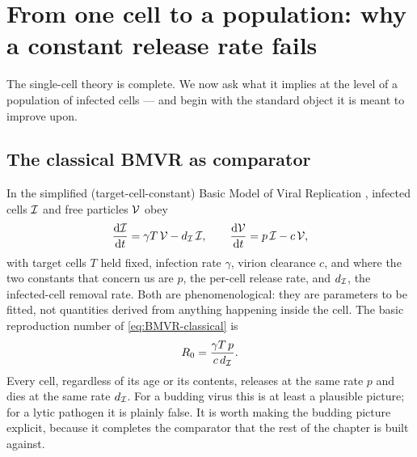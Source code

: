 
\section{From one cell to a population: why a constant release rate fails}
\label{sec:why-constant-fails}

The single-cell theory is complete. We now ask what it implies at the level
of a population of infected cells --- and begin with the standard object it
is meant to improve upon.

\subsection{The classical BMVR as comparator}
\label{sec:bmvr-classical}

In the simplified (target-cell-constant) Basic Model of Viral Replication
\cite{mclean1993balance,nowak1996population,perelson1996hiv}, infected
cells $\mathcal{I}$ and free particles $\mathcal{V}$ obey
\begin{equation}
\displaystyle\frac{{\rm d} \mathcal{I}}{{\rm d} t} = \gamma T\,\mathcal{V} - d_{\mathcal{I}}\,\mathcal{I},
\qquad
\displaystyle\frac{{\rm d} \mathcal{V}}{{\rm d} t} = p\,\mathcal{I} - c\,\mathcal{V},
\label{eq:BMVR-classical}
\end{equation}
with target cells $T$ held fixed, infection rate $\gamma$, virion clearance
$c$, and where the two constants that concern us are $p$, the per-cell
release rate, and $d_{\mathcal{I}}$, the infected-cell removal rate. Both are
phenomenological: they are parameters to be fitted, not quantities derived
from anything happening inside the cell. The basic reproduction number of
\eqref{eq:BMVR-classical} is
\begin{equation}
R_0=\frac{\gamma T\,p}{c\,d_{\mathcal{I}}}.
\end{equation}
Every cell, regardless of its age or its contents, releases at the same rate
$p$ and dies at the same rate $d_{\mathcal{I}}$. For a budding virus this is at
least a plausible picture; for a lytic pathogen it is plainly false. It is
worth making the budding picture explicit, because it completes the
comparator that the rest of the chapter is built against.

